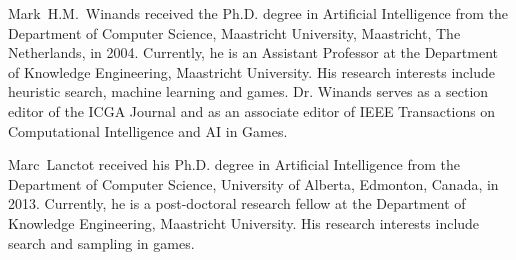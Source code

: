 \documentclass[journal]{IEEEtran}
\begin{document}
\begin{IEEEbiography}{Mark~H.M.~Winands}
received the Ph.D. degree in Artificial Intelligence from the Department of Computer Science, Maastricht University, Maastricht, The Netherlands, in 2004. Currently, he is an Assistant Professor at the Department of Knowledge Engineering, Maastricht University. His research interests include heuristic search, machine learning and games. Dr. Winands serves as a section editor of the ICGA Journal and as an associate editor of IEEE Transactions on Computational Intelligence and AI
in Games.
\end{IEEEbiography}

\begin{IEEEbiography}{Marc~Lanctot}
received his Ph.D. degree in Artificial Intelligence from the Department of Computer Science, University of Alberta, Edmonton, Canada, in 2013. Currently, he is a post-doctoral research fellow at the Department of Knowledge Engineering, Maastricht University. His research interests include search and sampling in games. 
\end{IEEEbiography}


\end{document}
